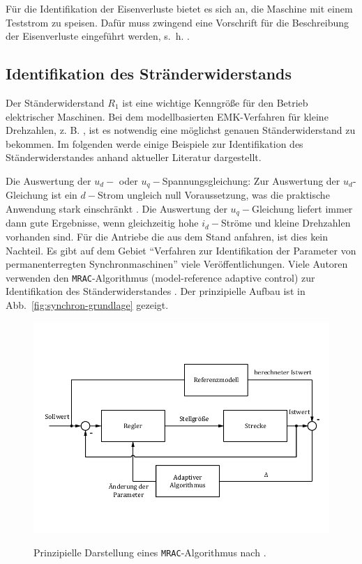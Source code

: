 \documentclass[conference,twocolumn]{IEEEtran}
\begin{document}
Für die Identifikation der Eisenverluste bietet es sich an, die Maschine mit einem Teststrom zu speisen.
Dafür muss zwingend eine Vorschrift für die Beschreibung der Eisenverluste eingeführt werden, s.~h. \autocite[S.~75]{Kellner2012}.

\subsection{Identifikation des Stränderwiderstands}\label{sec:sident}

Der Ständerwiderstand $R_1$ ist eine wichtige Kenngröße für den Betrieb elektrischer Maschinen.
Bei dem modellbasierten EMK-Verfahren für kleine Drehzahlen, z. B. \autocite{genduso}, ist es notwendig eine möglichst genauen Ständerwiderstand zu bekommen.
Im folgenden werde einige Beispiele zur Identifikation des Ständerwiderstandes anhand aktueller Literatur dargestellt.

Die Auswertung der $u_d-$ oder $u_q-$Spannungsgleichung: Zur Auswertung der $u_d$-Gleichung ist ein $d-$Strom ungleich null Voraussetzung, was die praktische Anwendung stark einschränkt \autocite{Kellner2012}.
Die Auswertung der $u_q-$Gleichung liefert immer dann gute Ergebnisse, wenn gleichzeitig hohe $i_d-$Ströme und kleine Drehzahlen vorhanden sind.
Für die Antriebe die aus dem Stand anfahren, ist dies kein Nachteil.
Es gibt auf dem Gebiet \enquote{Verfahren zur Identifikation der Parameter von permanenterregten Synchronmaschinen} viele Veröffentlichungen.
Viele Autoren verwenden den \texttt{MRAC}-Algorithmus (model-reference adaptive control) zur Identifikation des Ständerwiderstandes \autocite{slotine_applied_1991}.
Der prinzipielle Aufbau ist in Abb.~\ref{fig:synchron-grundlage} gezeigt.

\begin{figure}
\includegraphics[width=\columnwidth]{img/mrac}
\label{fig:mrac}
\caption{Prinzipielle Darstellung eines \texttt{MRAC}-Algorithmus nach \textcite{slotine_applied_1991}.}
\end{figure}
\end{document}

